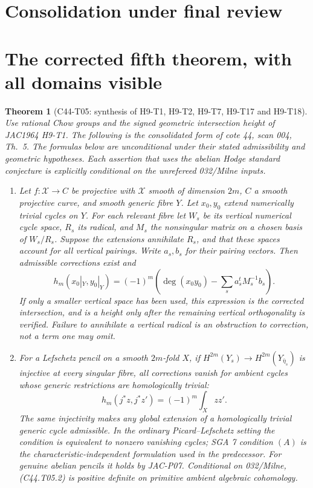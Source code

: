 \documentclass[11pt]{article}
\newtheorem{theorem}{Theorem}[section]
\theoremstyle{remark}\newtheorem{remark}[theorem]{Remark}
\begin{document}
\section{Consolidation under final review}
\section{The corrected fifth theorem, with all domains visible}

\begin{theorem}[C44-T05: synthesis of H9-T1, H9-T2, H9-T7,
H9-T17 and H9-T18]\label{thm:final-th5}
Use rational Chow groups and the signed geometric intersection height
of JAC1964 H9-T1. The following is the consolidated form of cote 44,
scan 004, Th.~5. The formulas below are unconditional under their
stated admissibility and geometric hypotheses. Each assertion that
uses the abelian Hodge standard conjecture is explicitly conditional
on the unrefereed 032/Milne inputs.

\begin{enumerate}
\item Let $f:\mathcal X\to C$ be projective with $\mathcal X$ smooth
of dimension $2m$, $C$ a smooth projective curve, and smooth generic
fibre $Y$. Let $x_0,y_0$ extend numerically trivial cycles on $Y$.
For each relevant fibre let $W_s$ be its vertical numerical cycle
space, $R_s$ its radical, and $M_s$ the nonsingular matrix on a chosen
basis of $W_s/R_s$. Suppose the extensions annihilate $R_s$, and
that these spaces account for all vertical pairings. Write $a_s,b_s$
for their pairing vectors. Then admissible corrections exist and
\[
 h_m(x_0|_Y,y_0|_Y)=(-1)^m
 \left(\deg(x_0y_0)-\sum_s a_s^{t}M_s^{-1}b_s\right).
 \tag{C44.T05.1}
\]
If only a smaller vertical space has been used, this expression is
the corrected intersection, and is a height only after the remaining
vertical orthogonality is verified. Failure to annihilate a vertical
radical is an obstruction to correction, not a term one may omit.

\item For a Lefschetz pencil on a smooth $2m$-fold $X$, if
$H^{2m}(Y_s)\to H^{2m}(Y_{\bar\eta_s})$ is injective at every
singular fibre, all corrections vanish for ambient cycles whose
generic restrictions are homologically trivial:
\[
                  h_m(j^*z,j^*z')=(-1)^m\int_Xzz'.
 \tag{C44.T05.2}
\]
The same injectivity makes any global extension of a homologically
trivial generic cycle admissible. In the ordinary Picard--Lefschetz
setting the condition is equivalent to nonzero vanishing cycles;
SGA 7 condition $(A)$ is the characteristic-independent formulation
used in the predecessor. For genuine abelian pencils it holds by
JAC-P07. Conditional on 032/Milne, (C44.T05.2) is positive definite
on primitive ambient algebraic cohomology.


\end{enumerate}
\end{theorem}
\end{document}
